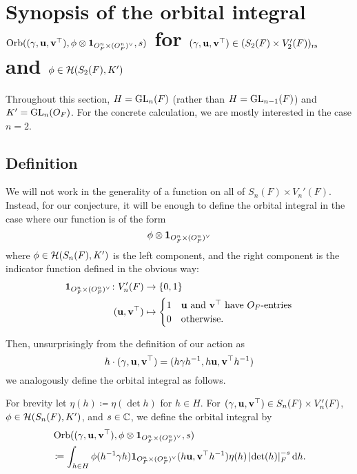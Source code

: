 \chapter{Synopsis of the orbital integral
  $\operatorname{Orb}((\gamma, \mathbf u, \mathbf v^\top), \phi \otimes \mathbf{1}_{O_F^n \times (O_F^n)^\vee}, s)$
  for $(\gamma, \mathbf u, \mathbf v^\top) \in (S_2(F) \times V'_2(F))_{\mathrm{rs}}$
  and $\phi \in \mathcal H(S_2(F), K')$}
\label{ch:orbitalFJ0}

Throughout this section, $H = \operatorname{GL}_n(F)$ (rather than $H = \operatorname{GL}_{n-1}(F)$)
and $K' = \operatorname{GL}_n(O_F)$.
For the concrete calculation, we are mostly interested in the case $n = 2$.

\section{Definition}
We will not work in the generality of a function on all of $S_n(F) \times V_n'(F)$.
Instead, for our conjecture, it will be enough to define the orbital integral
in the case where our function is of the form
\[ \phi \otimes \mathbf{1}_{O_F^n \times (O_F^n)^\vee} \]
where $\phi \in \mathcal H(S_n(F), K')$ is the left component, and
the right component is the indicator function defined in the obvious way:
\begin{align*}
  \mathbf{1}_{O_F^n \times (O_F^n)^\vee} \colon V'_n(F) &\to \{0,1\} \\
  (\mathbf u, \mathbf v^\top) &\mapsto
  \begin{cases}
    1 & \mathbf u \text{ and } \mathbf v^\top \text{ have } O_F \text{-entries} \\
    0 & \text{otherwise}.
  \end{cases}
\end{align*}

Then, unsurprisingly from the definition of our action as
\[ h \cdot (\gamma, \mathbf u, \mathbf v^\top) = (h\gamma h^{-1}, h\mathbf u, \mathbf v^\top h^{-1}) \]
we analogously define the orbital integral as follows.
\begin{definition}
  For brevity let $\eta(h) \coloneqq \eta(\det h)$ for $h \in H$.
  For $(\gamma, \mathbf u, \mathbf v^\top) \in S_n(F) \times V'_n(F)$,
  $\phi \in \mathcal H(S_n(F), K')$, and $s \in \mathbb C$,
  we define the orbital integral by
  \begin{align*}
    & \Orb((\gamma, \uu, \vv^\top), \phi \otimes \oneV, s) \\
    &\coloneqq \int_{h \in H} \phi(h\inv \gamma h) \oneV(h \uu, \vv^\top h^{-1})
    \eta(h) \left\lvert \det(h) \right\rvert_F^{-s} \odif h.
  \end{align*}
  \label{def:orbitalFJ}
\end{definition}

